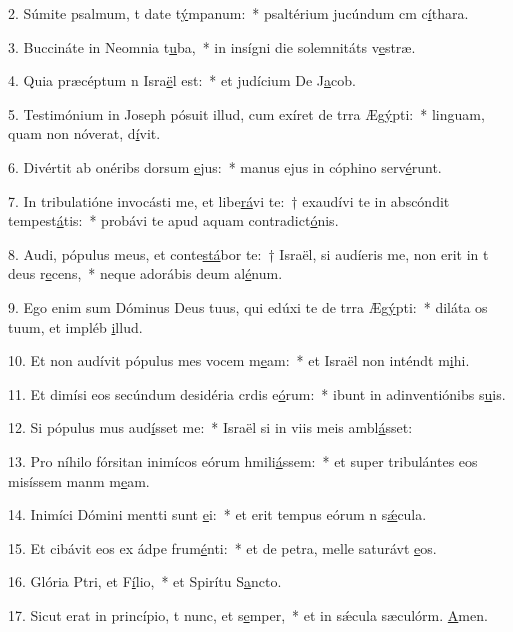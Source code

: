 2. Súmite psalmum, t date t\uline{ý}mpanum:~* psaltérium jucúndum cm c\uline{í}thara.\par 
3. Buccináte in Neomnia t\uline{u}ba,~* in insígni die solemnitáts v\uline{e}stræ.\par 
4. Quia præcéptum n Isra\uline{ë}l est:~* et judícium De J\uline{a}cob.\par 
5. Testimónium in Joseph pósuit illud, cum exíret de trra Æg\uline{ý}pti:~* linguam, quam non nóverat, d\uline{í}vit.\par 
6. Divértit ab onéribs dorsum \uline{e}jus:~* manus ejus in cóphino serv\uline{é}runt.\par 
7. In tribulatióne invocásti me, et libe\uline{rá}vi te:~† exaudívi te in abscóndit tempest\uline{á}tis:~* probávi te apud aquam contradict\uline{ó}nis.\par 
8. Audi, pópulus meus, et conte\uline{stá}bor te:~† Israël, si audíeris me, non erit in t deus r\uline{e}cens,~* neque adorábis deum al\uline{é}num.\par 
9. Ego enim sum Dóminus Deus tuus, qui edúxi te de trra Æg\uline{ý}pti:~* diláta os tuum, et impléb \uline{i}llud.\par 
10. Et non audívit pópulus mes vocem m\uline{e}am:~* et Israël non inténdt m\uline{i}hi.\par 
11. Et dimísi eos secúndum desidéria crdis e\uline{ó}rum:~* ibunt in adinventiónibs s\uline{u}is.\par 
12. Si pópulus mus aud\uline{í}sset me:~* Israël si in viis meis ambl\uline{á}sset:\par 
13. Pro níhilo fórsitan inimícos eórum hmili\uline{á}ssem:~* et super tribulántes eos misíssem manm m\uline{e}am.\par 
14. Inimíci Dómini mentti sunt \uline{e}i:~* et erit tempus eórum n s\uline{ǽ}cula.\par 
15. Et cibávit eos ex ádpe frum\uline{é}nti:~* et de petra, melle saturávt \uline{e}os.\par 
16. Glória Ptri, et F\uline{í}lio,~* et Spirítu S\uline{a}ncto.\par 
17. Sicut erat in princípio, t nunc, et s\uline{e}mper,~* et in sǽcula sæculórm. \uline{A}men.\par 
